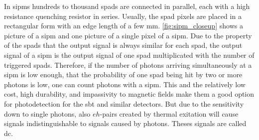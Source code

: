 
In \acp{sipm} hundreds to thousand \acp{spad} are connected in parallel, each with a high resistance quenching resistor in series. 
Usually, the \ac{spad} pixels are placed in a rectangular form with an edge length of a few \si{\milli\meter}.
\autoref{fig:sipm_closeup} shows a picture of a \ac{sipm} and one picture of a single pixel of a \ac{sipm}.
Due to the property of the \acp{spad} that the output signal is always similar for each \ac{spad}, the output signal of a \ac{sipm} is the output signal of one \ac{spad} multiplicated with the number of triggered \acp{spad}.
Therefore, if the number of photons arriving simultaneously at a \ac{sipm} is low enough, that the probability of one \ac{spad} being hit by two or more photons is low, one can count photons with a \ac{sipm}.
This and the relatively low cost, high durability, and impassivity to magnetic fields make them a good option for photodetection for the \ac{sbt} and similar detectors.
But due to the sensitivity down to single photons, also $eh$-pairs created by thermal exitation will cause signals indistinguishable to signals caused by photons.
Theses signals are called \ac{dc}.





